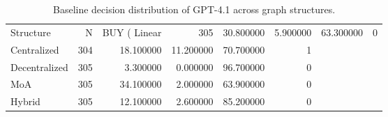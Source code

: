 \begin{table}
\caption{Baseline decision distribution of GPT-4.1 across graph structures.}
\label{tab:baseline}
\begin{tabular}{lrrrrr}
\toprule
Structure & N & BUY (%
\midrule
Linear & 305 & 30.800000 & 5.900000 & 63.300000 & 0 \\
Centralized & 304 & 18.100000 & 11.200000 & 70.700000 & 1 \\
Decentralized & 305 & 3.300000 & 0.000000 & 96.700000 & 0 \\
MoA & 305 & 34.100000 & 2.000000 & 63.900000 & 0 \\
Hybrid & 305 & 12.100000 & 2.600000 & 85.200000 & 0 \\
\bottomrule
\end{tabular}
\end{table}
